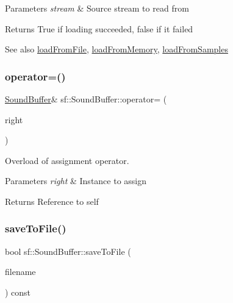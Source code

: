 \begin{DoxyParams}{Parameters}
{\em stream} & Source stream to read from\\
\hline
\end{DoxyParams}
\begin{DoxyReturn}{Returns}
True if loading succeeded, false if it failed
\end{DoxyReturn}
\begin{DoxySeeAlso}{See also}
\hyperlink{classsf_1_1_sound_buffer_a2be6a8025c97eb622a7dff6cf2594394}{load\+From\+File}, \hyperlink{classsf_1_1_sound_buffer_af8cfa5599739a7edae69c5cba273d33f}{load\+From\+Memory}, \hyperlink{classsf_1_1_sound_buffer_a42d51ce4bb3b60c7ea06f63c273fd063}{load\+From\+Samples} 
\end{DoxySeeAlso}
\mbox{\label{classsf_1_1_sound_buffer_adcc786b60bbd95be1551368fafd274a7}} 
\subsubsection{\texorpdfstring{operator=()}{operator=()}}
{\footnotesize\ttfamily \hyperlink{classsf_1_1_sound_buffer}{Sound\+Buffer}\& sf\+::\+Sound\+Buffer\+::operator= (\begin{DoxyParamCaption}\item[{const \hyperlink{classsf_1_1_sound_buffer}{Sound\+Buffer} \&}]{right }\end{DoxyParamCaption})}



Overload of assignment operator. 


\begin{DoxyParams}{Parameters}
{\em right} & Instance to assign\\
\hline
\end{DoxyParams}
\begin{DoxyReturn}{Returns}
Reference to self 
\end{DoxyReturn}
\mbox{\label{classsf_1_1_sound_buffer_aade64260c6375580a085314a30be007e}} 
\subsubsection{\texorpdfstring{save\+To\+File()}{saveToFile()}}
{\footnotesize\ttfamily bool sf\+::\+Sound\+Buffer\+::save\+To\+File (\begin{DoxyParamCaption}\item[{const std\+::string \&}]{filename }\end{DoxyParamCaption}) const}



